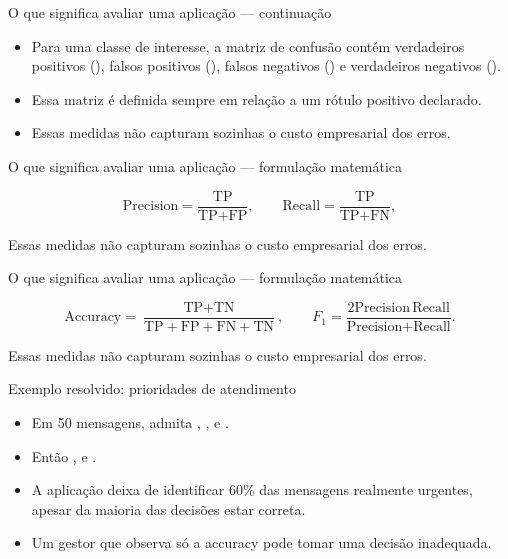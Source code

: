 \documentclass[10pt,aspectratio=169]{beamer}
\begin{document}
\begin{frame}[t]{O que significa avaliar uma aplicação — continuação}
\small
\begin{itemize}
\item Para uma classe de interesse, a matriz de confusão contém verdadeiros positivos (), falsos positivos (), falsos negativos () e verdadeiros negativos ().
\item Essa matriz é definida sempre em relação a um rótulo positivo declarado.
\item Essas medidas não capturam sozinhas o custo empresarial dos erros.
\end{itemize}
\end{frame}

\begin{frame}[t]{O que significa avaliar uma aplicação — formulação matemática}
\small
\vspace{3mm}\begin{center}\small\[\text{Precision}=\frac{\text{TP}}{\text{TP}+\text{FP}},\qquad
\text{Recall}=\frac{\text{TP}}{\text{TP}+\text{FN}},\]\end{center}
\vspace{3mm}\small Essas medidas não capturam sozinhas o custo empresarial dos erros.
\end{frame}

\begin{frame}[t]{O que significa avaliar uma aplicação — formulação matemática}
\small
\vspace{3mm}\begin{center}\small\[\text{Accuracy}=\frac{\text{TP}+\text{TN}}{\text{TP}+\text{FP}+\text{FN}+\text{TN}},\qquad
F_1=\frac{2\text{Precision}\,\text{Recall}}{\text{Precision}+\text{Recall}}.\]\end{center}
\vspace{3mm}\small Essas medidas não capturam sozinhas o custo empresarial dos erros.
\end{frame}

\begin{frame}[t]{Exemplo resolvido: prioridades de atendimento}
\small
\begin{itemize}
\item Em 50 mensagens, admita , , e .
\item Então , e .
\item A aplicação deixa de identificar 60\% das mensagens realmente urgentes, apesar da maioria das decisões estar correta.
\item Um gestor que observa só a accuracy pode tomar uma decisão inadequada.
\end{itemize}
\end{frame}
\end{document}
